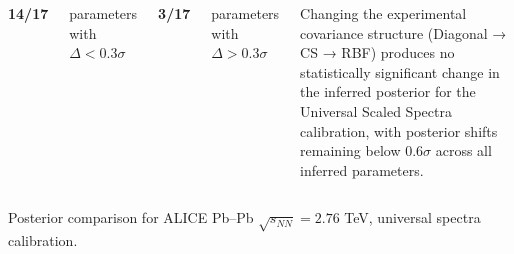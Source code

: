 \begin{frame}
\begin{columns}[T]
\vspace{0.68cm}

{\fontsize{11}{12}\selectfont\bfseries
14/17
}

\vspace{0.08cm}

\tiny
parameters with\\
$\Delta<0.3\sigma$

\vspace{0.38cm}

{\fontsize{11}{12}\selectfont\bfseries
3/17
}

\vspace{0.08cm}

\tiny
parameters with\\
$\Delta>0.3\sigma$

\vfill
\vspace{0.24cm}

\tiny
Changing the experimental covariance structure (Diagonal → CS → RBF) produces no statistically significant change in the inferred posterior for the Universal Scaled Spectra calibration, with posterior shifts remaining below $0.6\sigma$ across all inferred parameters.
\end{columns}

\vspace{0.12cm}

\centering
\tiny
Posterior comparison for ALICE Pb--Pb $\sqrt{s_{NN}}=2.76$ TeV, universal spectra calibration.
\end{frame}